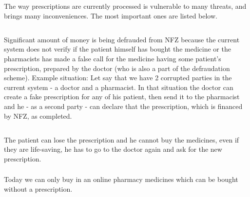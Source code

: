 \chapter{   } \label{ti}

The way prescriptions are currently processed is vulnerable to many threats, and brings many inconveniences. The most important ones are listed below.

\section{}

\subsection{}

Significant amount of money is being defrauded from NFZ because the
current system does not verify if the patient himself has bought the
medicine or the pharmacists has made a false call for the medicine
having some patient's prescription, prepared by the doctor (who is
also a part of the defraudation scheme).
Example situation: Let say that we have 2 corrupted parties in the current system - a doctor and a pharmacist. In that situation the doctor can create a fake prescription for any of his patient, then send it to the pharmacist and he - as a second party - can declare that the prescription, which is financed by NFZ, as completed.

\section{}

\subsection{}
The patient can lose the prescription and he cannot buy the medicines,
even if they are life-saving, he has to go to the doctor again and
ask for the new prescription.

\subsection{}
Today we can only buy in an online pharmacy medicines which can be bought without a prescription.


\section{}

